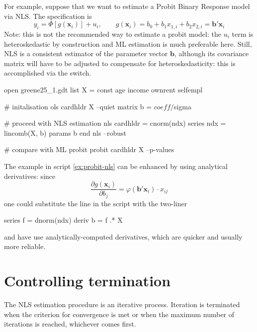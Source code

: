 For example, suppose that we want to estimate a Probit Binary Response
model via NLS. The specification is
\begin{equation}
\label{eq:probit-nls}
y_i = \Phi\left[g(\bm{x}_i)\right] + u_i, \qquad g(\bm{x}_i) = b_0 +
b_1 x_{1,i} + b_2 x_{2,i} = \bm{b}'\bm{x}_i
\end{equation}
Note: this is not the recommended way to estimate a probit model: the
$u_i$ term is heteroskedastic by construction and ML estimation is
much preferable here. Still, NLS is a consistent estimator of the
parameter vector $\bm{b}$, although its covariance matrix will have to
be adjusted to compensate for heteroskedasticity: this is accomplished
via the  switch.

\begin{script}[htbp]
  \begin{scode}
    open greene25_1.gdt
    list X = const age income ownrent selfempl

    # initalisation
    ols cardhldr X --quiet
    matrix b = $coeff / $sigma

    # proceed with NLS estimation
    nls cardhldr = cnorm(ndx)
        series ndx = lincomb(X, b)
        params b
    end nls --robust

    # compare with ML probit 
    probit cardhldr X --p-values
  \end{scode}
\end{script}

The example in script \ref{ex:probit-nls} can be enhanced by
using analytical derivatives: since
\[
\frac{\partial g(\bm{x}_i)}{\partial b_j} = \varphi(\bm{b}'\bm{x}_i) \cdot x_{ij}
\]
one could substitute the  line in the script with the two-liner
\begin{code}
  series f = dnorm(ndx)
  deriv b = {f} .* {X}
\end{code}
and have  use analytically-computed derivatives, which are
quicker and usually more reliable.

\section{Controlling termination}
\label{nls-toler}

The NLS estimation procedure is an iterative process.  Iteration is
terminated when the criterion for convergence is met or when the
maximum number of iterations is reached, whichever comes first.

